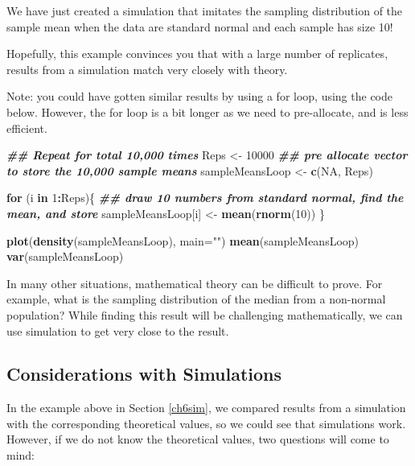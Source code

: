 \documentclass[
]{book}
\newenvironment{Shaded}{\begin{snugshade}}{\end{snugshade}}
\newcommand{\AttributeTok}[1]{\textcolor[rgb]{0.13,0.29,0.53}{#1}}
\newcommand{\ConstantTok}[1]{\textcolor[rgb]{0.56,0.35,0.01}{#1}}
\newcommand{\ControlFlowTok}[1]{\textcolor[rgb]{0.13,0.29,0.53}{\textbf{#1}}}
\newcommand{\DecValTok}[1]{\textcolor[rgb]{0.00,0.00,0.81}{#1}}
\newcommand{\DocumentationTok}[1]{\textcolor[rgb]{0.56,0.35,0.01}{\textbf{\textit{#1}}}}
\newcommand{\FunctionTok}[1]{\textcolor[rgb]{0.13,0.29,0.53}{\textbf{#1}}}
\newcommand{\NormalTok}[1]{#1}
\newcommand{\OtherTok}[1]{\textcolor[rgb]{0.56,0.35,0.01}{#1}}
\newcommand{\SpecialCharTok}[1]{\textcolor[rgb]{0.81,0.36,0.00}{\textbf{#1}}}
\newcommand{\StringTok}[1]{\textcolor[rgb]{0.31,0.60,0.02}{#1}}
\theoremstyle{definition}
\theoremstyle{definition}
\theoremstyle{definition}
\theoremstyle{definition}
\theoremstyle{remark}
\begin{document}
We have just created a simulation that imitates the sampling distribution of the sample mean when the data are standard normal and each sample has size 10!

Hopefully, this example convinces you that with a large number of replicates, results from a simulation match very closely with theory.

Note: you could have gotten similar results by using a for loop, using the code below. However, the for loop is a bit longer as we need to pre-allocate, and is less efficient.

\begin{Shaded}
\begin{Highlighting}[]
\DocumentationTok{\#\# Repeat for total 10,000 times}
\NormalTok{Reps }\OtherTok{\textless{}{-}} \DecValTok{10000} 
\DocumentationTok{\#\# pre allocate vector to store the 10,000 sample means}
\NormalTok{sampleMeansLoop }\OtherTok{\textless{}{-}} \FunctionTok{c}\NormalTok{(}\ConstantTok{NA}\NormalTok{, Reps) }

\ControlFlowTok{for}\NormalTok{ (i }\ControlFlowTok{in} \DecValTok{1}\SpecialCharTok{:}\NormalTok{Reps)\{}
  \DocumentationTok{\#\# draw 10 numbers from standard normal, find the mean, and store}
\NormalTok{  sampleMeansLoop[i] }\OtherTok{\textless{}{-}} \FunctionTok{mean}\NormalTok{(}\FunctionTok{rnorm}\NormalTok{(}\DecValTok{10}\NormalTok{))}
\NormalTok{\}}

\FunctionTok{plot}\NormalTok{(}\FunctionTok{density}\NormalTok{(sampleMeansLoop), }\AttributeTok{main=}\StringTok{""}\NormalTok{)}
\FunctionTok{mean}\NormalTok{(sampleMeansLoop)}
\FunctionTok{var}\NormalTok{(sampleMeansLoop)}
\end{Highlighting}
\end{Shaded}

In many other situations, mathematical theory can be difficult to prove. For example, what is the sampling distribution of the median from a non-normal population? While finding this result will be challenging mathematically, we can use simulation to get very close to the result.

\hypertarget{considerations-with-simulations}{%
\subsection{Considerations with Simulations}\label{considerations-with-simulations}}

In the example above in Section \ref{ch6sim}, we compared results from a simulation with the corresponding theoretical values, so we could see that simulations work. However, if we do not know the theoretical values, two questions will come to mind:
\end{document}
